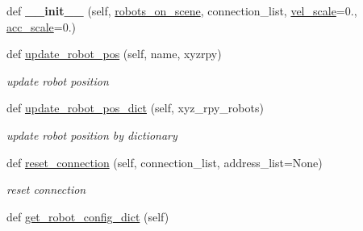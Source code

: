 \begin{DoxyCompactItemize}
\item 
\mbox{\label{classrnb-planning_1_1src_1_1pkg_1_1controller_1_1combined__robot_1_1_combined_robot_ad1bae4492cce3c3ea69871c943cf7566}} 
def {\bfseries \+\_\+\+\_\+init\+\_\+\+\_\+} (self, \hyperlink{classrnb-planning_1_1src_1_1pkg_1_1controller_1_1combined__robot_1_1_combined_robot_a5d116642a9d547410162084f7482ba7f}{robots\+\_\+on\+\_\+scene}, connection\+\_\+list, \hyperlink{classrnb-planning_1_1src_1_1pkg_1_1controller_1_1combined__robot_1_1_combined_robot_a5cdbda9a04dcdccca6b1a5367b9d74a3}{vel\+\_\+scale}=0., \hyperlink{classrnb-planning_1_1src_1_1pkg_1_1controller_1_1combined__robot_1_1_combined_robot_a83d992d5637b5adaaa6952f2228c6054}{acc\+\_\+scale}=0.)
\item 
def \hyperlink{classrnb-planning_1_1src_1_1pkg_1_1controller_1_1combined__robot_1_1_combined_robot_a6cef8899224b996aa6200e9abd5b9ae0}{update\+\_\+robot\+\_\+pos} (self, name, xyzrpy)
\begin{DoxyCompactList}\small\item\em update robot position \end{DoxyCompactList}\item 
def \hyperlink{classrnb-planning_1_1src_1_1pkg_1_1controller_1_1combined__robot_1_1_combined_robot_a9a9b8c7c2ee78d719658e4fe4e11521c}{update\+\_\+robot\+\_\+pos\+\_\+dict} (self, xyz\+\_\+rpy\+\_\+robots)
\begin{DoxyCompactList}\small\item\em update robot position by dictionary \end{DoxyCompactList}\item 
def \hyperlink{classrnb-planning_1_1src_1_1pkg_1_1controller_1_1combined__robot_1_1_combined_robot_a1566ece11baa27d6c4d5cf740b2a2a03}{reset\+\_\+connection} (self, connection\+\_\+list, address\+\_\+list=None)
\begin{DoxyCompactList}\small\item\em reset connection \end{DoxyCompactList}\item 
\mbox{\label{classrnb-planning_1_1src_1_1pkg_1_1controller_1_1combined__robot_1_1_combined_robot_aa70553a7d6dba5f95a011d70197612f5}} 
def \hyperlink{classrnb-planning_1_1src_1_1pkg_1_1controller_1_1combined__robot_1_1_combined_robot_aa70553a7d6dba5f95a011d70197612f5}{get\+\_\+robot\+\_\+config\+\_\+dict} (self)

\end{DoxyCompactItemize}
